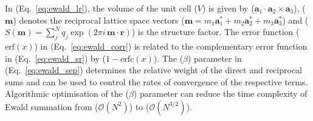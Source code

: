 In (Eq.~\ref{eq:ewald_lr}), the volume of the unit cell ($V$) is given by ($\mathbf{a}_1 \cdot \mathbf{a}_2 \times \mathbf{a}_3$), ($\mathbf{m}$) denotes the reciprocal lattice space vectors ($\mathbf{m}  =  m_1\mathbf{a}_1^{\ast} + m_2\mathbf{a}_2^{\ast} + m_3\mathbf{a}_3^{\ast}$) and ($S(\mathbf{m}) = \sum_{j}^{N} q_j \exp{(2 \pi i\, \mathbf{m\cdot r})}$) is the structure factor. The error function ($\mathrm{erf}(x)$) in (Eq.~\ref{eq:ewald_corr}) is related to the complementary error function in (Eq.~\ref{eq:ewald_sr}) by ($1 - \mathrm{erfc}(x)$). The ($\beta$) parameter in (Eq.~\ref{eq:ewald_sep}) determines the relative weight of the direct and reciprocal sums and can be used to control the rates of convergence of the respective terms. Algorithmic optimisation of the ($\beta$) parameter can reduce the time complexity of Ewald summation from ($\mathcal{O}(N^2)$) to ($\mathcal{O}(N^{3/2})$).\cite{karasawa1989acceleration,Darden1993} 

